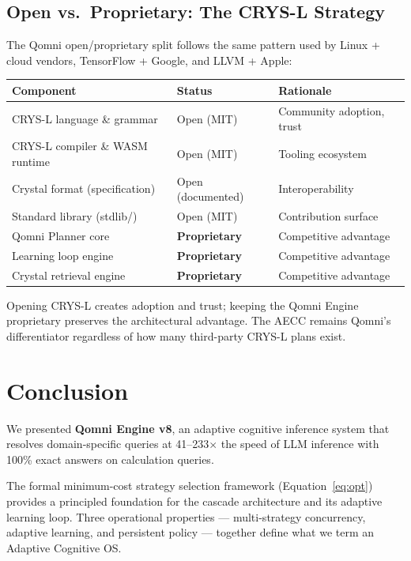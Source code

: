 \documentclass[12pt,a4paper]{article}
\begin{document}
\subsection{Open vs.\ Proprietary: The CRYS-L Strategy}

The Qomni open/proprietary split follows the same pattern used by
Linux + cloud vendors, TensorFlow + Google, and LLVM + Apple:

\begin{center}
\begin{tabular}{lll}
\toprule
Component & Status & Rationale \\
\midrule
CRYS-L language \& grammar & Open (MIT) & Community adoption, trust \\
CRYS-L compiler \& WASM runtime & Open (MIT) & Tooling ecosystem \\
Crystal format (specification) & Open (documented) & Interoperability \\
Standard library (stdlib/) & Open (MIT) & Contribution surface \\
Qomni Planner core & \textbf{Proprietary} & Competitive advantage \\
Learning loop engine & \textbf{Proprietary} & Competitive advantage \\
Crystal retrieval engine & \textbf{Proprietary} & Competitive advantage \\
\bottomrule
\end{tabular}
\end{center}

Opening CRYS-L creates adoption and trust; keeping the Qomni Engine
proprietary preserves the architectural advantage.
The AECC remains Qomni's differentiator regardless of how many
third-party CRYS-L plans exist.

\section{Conclusion}
\label{sec:conclusion}

We presented \textbf{Qomni Engine v8}, an adaptive cognitive inference system
that resolves domain-specific queries at 41--233$\times$ the speed of LLM
inference with 100\% exact answers on calculation queries.

The formal minimum-cost strategy selection framework (Equation~\ref{eq:opt})
provides a principled foundation for the cascade architecture and its
adaptive learning loop. Three operational properties --- multi-strategy
concurrency, adaptive learning, and persistent policy --- together define
what we term an Adaptive Cognitive OS.
\end{document}
